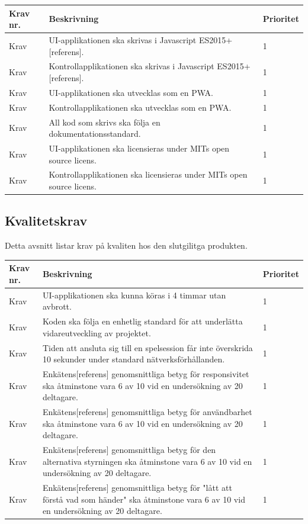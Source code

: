 \documentclass[10pt]{article}
\newcounter{indexcounter}
\newcommand{\Krav}[2]{
	\stepcounter{indexcounter}
	Krav \arabic{indexcounter} & #1 & #2 \\ \hline
}
\begin{document}
	\begin{tabular}{| p{2cm} | p{8cm} | p{2cm}|}
		\hline
		\textbf{Krav nr.} & \textbf{Beskrivning} & \textbf{Prioritet} \\ \hline
		
		\Krav{UI-applikationen ska skrivas i Javascript ES2015+[referens].}{1}
		\Krav{Kontrollapplikationen ska skrivas i Javascript ES2015+[referens].}{1}
		\Krav{UI-applikationen ska utvecklas som en PWA.}{1}
		\Krav{Kontrollapplikationen ska utvecklas som en PWA.}{1}
		\Krav{All kod som skrivs ska följa en dokumentationsstandard.}{1}
		\Krav{UI-applikationen ska licensieras under MITs open source licens.}{1}
		\Krav{Kontrollapplikationen ska licensieras under MITs open source licens.}{1}
		
	\end{tabular}

	\subsection{Kvalitetskrav}
	Detta avsnitt listar krav på kvaliten hos den slutgilitga produkten.
	
		\begin{tabular}{|p{2cm}|p{8cm}|p{2cm}|}
		\hline
		\textbf{Krav nr.} & \textbf{Beskrivning} & \textbf{Prioritet} \\ \hline
		
		\Krav{UI-applikationen ska kunna köras i 4 timmar utan avbrott.}{1}
		\Krav{Koden ska följa en enhetlig standard för att underlätta vidareutveckling av projektet.}{1}
		\Krav{Tiden att ansluta sig till en spelsession får inte överskrida 10 sekunder under standard nätverksförhållanden.}{1}
		\Krav{Enkätens[referens] genomsnittliga betyg för responsivitet ska åtminstone vara 6 av 10 vid en undersökning av 20 deltagare.}{1}
		\Krav{Enkätens[referens] genomsnittliga betyg för användbarhet ska åtminstone vara 6 av 10 vid en undersökning av 20 deltagare.}{1}
		\Krav{Enkätens[referens] genomsnittliga betyg för den alternativa styrningen ska åtminstone vara 6 av 10 vid en undersökning av 20 deltagare.}{1}
		\Krav{Enkätens[referens] genomsnittliga betyg för "lått att förstå vad som händer" ska åtminstone vara 6 av 10 vid en undersökning av 20 deltagare.}{1}
				
	\end{tabular}
	
\pagebreak

\printbibliography
{}
\end{document}
